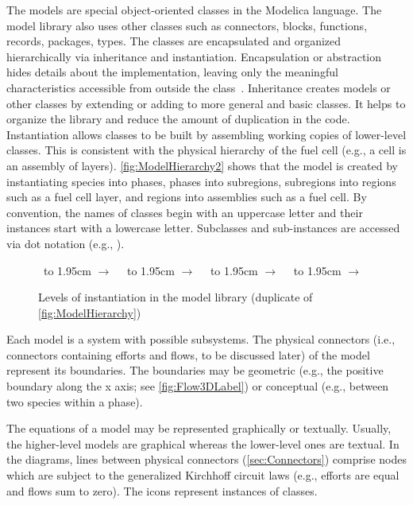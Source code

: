 The models are special object-oriented classes in the Modelica language.  The model library also uses other classes such as connectors, blocks, functions, records, packages, types.  The classes are encapsulated and organized hierarchically via inheritance and instantiation.  Encapsulation or abstraction hides details about the implementation, leaving only the meaningful characteristics accessible from outside the class~\cite{Pyster2012}. %
Inheritance creates models or other classes by extending or adding to more general and basic classes.  It helps to organize the library and reduce the amount of duplication in the code.  Instantiation allows classes to be built by assembling working copies of lower-level classes.  This is consistent with the physical hierarchy of the fuel cell (e.g., a cell is an assembly of layers).  \autoref{fig:ModelHierarchy2} shows that the model is created by instantiating species into phases, phases into subregions, subregions into regions such as a fuel cell layer, and regions into assemblies such as a fuel cell.  By convention, the names of classes begin with an uppercase letter and their instances start with a lowercase letter.  Subclasses and sub-instances are accessed via dot notation (e.g., ).


\begin{figure}[htbp]
  \newcommand{\I}[1]{\fbox{\texttt{[image: \#1]}}}
  \newcommand{\arrow}{\vbox to 1.95cm {\vfil
    \hbox{\LARGE $\rightarrow$}
    \vfil}}
  \I{4-SpeciesI}~\arrow~\I{4-PhaseI}~\arrow~\I{4-SubregionI}~\arrow~~\arrow~\I{4-AssemblyI}%
  \caption{Levels of instantiation in the model library (duplicate of \autoref{fig:ModelHierarchy})}%
  \label{fig:ModelHierarchy2}%
\end{figure}


Each model is a system with possible subsystems.  The physical connectors (i.e., connectors containing efforts and flows, to be discussed later) of the model represent its boundaries.  The boundaries may be geometric (e.g., the positive boundary along the x axis; see \autoref{fig:Flow3DLabel}) or conceptual (e.g., between two species within a phase).

The equations of a model may be represented graphically or textually.  Usually, the higher-level models are graphical whereas the lower-level ones are textual.  In the diagrams, lines between physical connectors (\autoref{sec:Connectors}) comprise nodes which are subject to the generalized Kirchhoff circuit laws (e.g., efforts are equal and flows sum to zero).  The icons represent instances of classes.

